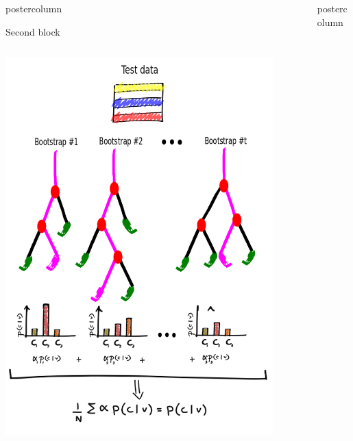 \documentclass[final]{beamer}
\newlength{\columnheight}
\begin{document}
\begin{frame}
\begin{columns}
\begin{column}{.33\textwidth}
\begin{beamercolorbox}[center,wd=\textwidth]{postercolumn}
\begin{minipage}[T]{.95\textwidth}
{\begin{block}{Second block}
\begin{itemize}
\begin{columns}
\begin{column}{.44\textwidth}
            			\includegraphics[width = 0.9\textwidth, height = 0.15\textheight]{images/framework/RF_test.png}
            		\end{column}
            \end{columns}
            \end{itemize}
            \end{block}          
            \vfill
         
           }
        \end{minipage}
      \end{beamercolorbox}
    \end{column}
    \begin{column}{.33\textwidth}
      \begin{beamercolorbox}[center,wd=\textwidth]{postercolumn}
        \begin{minipage}[T]{.95\textwidth}  %
          \parbox[t][\columnheight]{\textwidth}{ %

}
\end{minipage}
\end{beamercolorbox}
\end{column}
\end{columns}
\end{frame}
\end{document}
